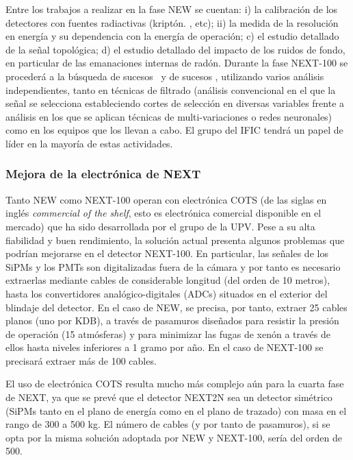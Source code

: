 Entre los trabajos a realizar en la fase NEW se cuentan: i) la calibración de los detectores con fuentes radiactivas (kriptón. \NA, \CS etc); ii) la medida de la resolución en energía y su dependencia con la energía de operación; c) el estudio detallado de la señal topológica; d) el estudio detallado del impacto de los ruidos de fondo, en particular de las emanaciones internas de radón. Durante la fase NEXT-100 se procederá a la búsqueda de sucesos \bb\ y de sucesos \bbonu, utilizando varios análisis independientes, tanto en técnicas de filtrado (análisis convencional en el que la señal se selecciona estableciendo cortes de selección en diversas variables frente a análisis en los que se aplican técnicas de multi-variaciones o redes neuronales) como en los equipos que los llevan a cabo. El grupo del IFIC tendrá un papel de líder en la mayoría de estas actividades. 
 
\subsubsection*{Mejora de la electrónica de NEXT}

Tanto NEW como NEXT-100 operan con electrónica COTS
(de las siglas en inglés {\em commercial of the shelf}, esto es electrónica comercial disponible en el mercado) que ha sido desarrollada por el grupo de la UPV. Pese a su alta fiabilidad y buen rendimiento, la solución actual presenta algunos problemas que podrían mejorarse en el detector NEXT-100. En particular, las señales de los SiPMs y los PMTs son digitalizadas fuera de la cámara y por tanto es necesario extraerlas mediante cables de considerable longitud (del orden de 10 metros), hasta los convertidores analógico-digitales (ADCs) situados en el exterior del blindaje del detector. En el caso de NEW, se precisa, por tanto, extraer 25 cables planos (uno por KDB), a través de pasamuros diseñados para resistir la presión de operación (15 atmósferas) y para minimizar las fugas de xenón a través de ellos hasta niveles inferiores a 1 gramo por año. En el caso de NEXT-100 se precisará extraer más de 100 cables. 

El uso de electrónica COTS resulta mucho más complejo aún para la cuarta fase de NEXT, ya que se prevé que el detector NEXT2N sea un detector simétrico (SiPMs tanto en el plano de energía como en el plano de trazado) con masa en el rango de 300 a 500 kg. El número  de cables (y por tanto de pasamuros), si se opta por la misma solución adoptada por NEW y NEXT-100, sería del orden de 500. 


